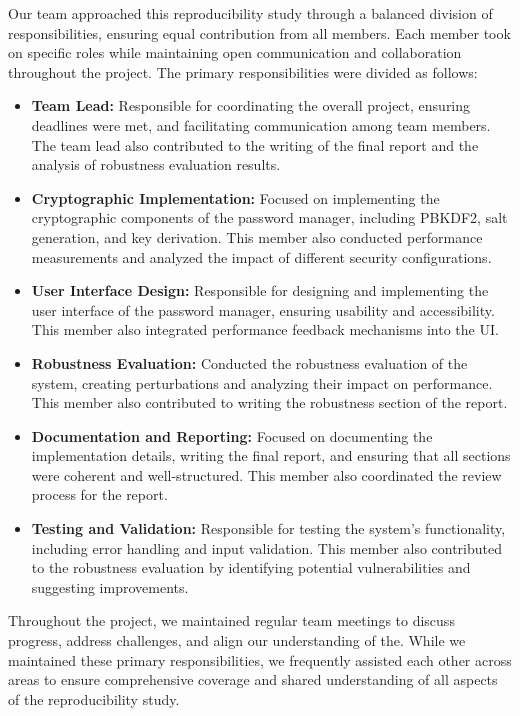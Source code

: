 \documentclass[11pt,a4paper]{article}
\begin{document}
Our team approached this reproducibility study through a balanced division of responsibilities, ensuring equal contribution from all members. Each member took on specific roles while maintaining open communication and collaboration throughout the project.
The primary responsibilities were divided as follows:
\begin{itemize}
    \item \textbf{Team Lead:} Responsible for coordinating the overall project, ensuring deadlines were met, and facilitating communication among team members. The team lead also contributed to the writing of the final report and the analysis of robustness evaluation results.
    \item \textbf{Cryptographic Implementation:} Focused on implementing the cryptographic components of the password manager, including PBKDF2, salt generation, and key derivation. This member also conducted performance measurements and analyzed the impact of different security configurations.
    \item \textbf{User Interface Design:} Responsible for designing and implementing the user interface of the password manager, ensuring usability and accessibility. This member also integrated performance feedback mechanisms into the UI.
    \item \textbf{Robustness Evaluation:} Conducted the robustness evaluation of the system, creating perturbations and analyzing their impact on performance. This member also contributed to writing the robustness section of the report.
    \item \textbf{Documentation and Reporting:} Focused on documenting the implementation details, writing the final report, and ensuring that all sections were coherent and well-structured. This member also coordinated the review process for the report.
    \item \textbf{Testing and Validation:} Responsible for testing the system's functionality, including error handling and input validation. This member also contributed to the robustness evaluation by identifying potential vulnerabilities and suggesting improvements.
\end{itemize}

Throughout the project, we maintained regular team meetings to discuss progress, address challenges, and align our understanding of the. While we maintained these primary responsibilities, we frequently assisted each other across areas to ensure comprehensive coverage and shared understanding of all aspects of the reproducibility study.
\end{document}
